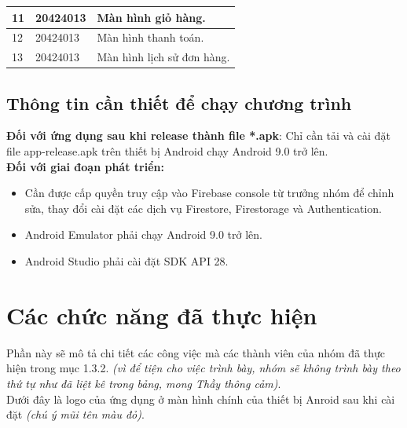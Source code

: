 \documentclass[12pt]{article}
\begin{document}
\begin{tabular}{ |p{1cm}||p{3cm}|p{12cm}| }
    11           & 20424013              & Màn hình giỏ hàng.                                                                                                                                     \\ \hline
    12           & 20424013              & Màn hình thanh toán.                                                                                                                                   \\ \hline
    13           & 20424013              & Màn hình lịch sử đơn hàng.                                                                                                                             \\ \hline
\end{tabular}

\subsection{Thông tin cần thiết để chạy chương trình}
\textbf{Đối với ứng dụng sau khi release thành file *.apk}: Chỉ cần tải và cài đặt file \textsf{app-release.apk} trên thiết bị Android chạy Android 9.0 trở lên.\\

\textbf{Đối với giai đoạn phát triển:}
\begin{itemize}
    \item Cần được cấp quyền truy cập vào Firebase console từ trưởng nhóm để chỉnh sửa, thay đổi cài đặt các dịch vụ Firestore, Firestorage và Authentication.
    \item Android Emulator phải chạy Android 9.0 trở lên.
    \item Android Studio phải cài đặt SDK API 28.
\end{itemize}

\section{Các chức năng đã thực hiện}
Phần này sẽ mô tả chi tiết các công việc mà các thành viên của nhóm đã thực hiện trong mục 1.3.2. \textit{(vì để tiện cho việc trình bày, nhóm sẽ không trình bày theo thứ tự như đã liệt kê trong bảng, mong Thầy thông cảm)}.\\

\indent Dưới đây là logo của ứng dụng ở màn hình chính của thiết bị Anroid sau khi cài đặt \textit{(chú ý mũi tên màu đỏ)}.
\end{document}
